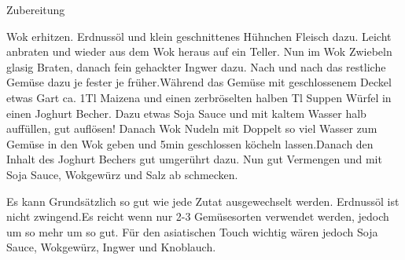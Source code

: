 {\Large Zubereitung} \newline
\begin{addmargin}[1cm]{0cm}
	Wok erhitzen. Erdnussöl und klein geschnittenes Hühnchen Fleisch dazu. Leicht anbraten und wieder
	aus dem Wok heraus auf ein Teller.\newline
	Nun im Wok Zwiebeln glasig Braten, danach fein gehackter Ingwer dazu. Nach und nach das restliche
	Gemüse dazu je fester je früher.\newline Während das Gemüse mit geschlossenem Deckel etwas Gart ca. 1Tl
	Maizena und einen zerbröselten halben Tl Suppen Würfel in einen Joghurt Becher. Dazu etwas Soja
	Sauce und mit kaltem Wasser halb auffüllen, gut auflösen!\newline
	Danach Wok Nudeln mit Doppelt so viel Wasser zum Gemüse in den Wok geben und 5min geschlossen
	köcheln lassen.\newline Danach den Inhalt des Joghurt Bechers gut umgerührt dazu.\newline
	Nun gut Vermengen und mit Soja Sauce, Wokgewürz und Salz ab schmecken.\newline\newline
	
	Es kann Grundsätzlich so gut wie jede Zutat ausgewechselt werden. Erdnussöl ist nicht zwingend.\newline Es reicht wenn nur 2-3 Gemüsesorten verwendet werden, jedoch
	um so mehr um so gut.\newline
	Für den asiatischen Touch wichtig wären jedoch Soja Sauce, Wokgewürz, Ingwer und Knoblauch.
	
	
	
	
\end{addmargin}
